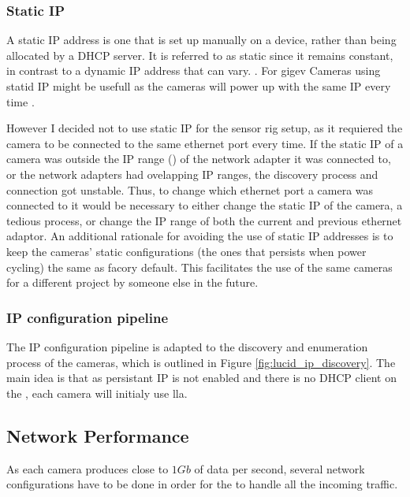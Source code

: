 \subsubsection{Static IP}
A static IP address is one that is set up manually on a device, rather than being allocated by a DHCP server.
It is referred to as static since it remains constant, in contrast to a dynamic IP address that can vary.
\cite{fisherStaticIPAddresses2021}.
For \gls{gigev} Cameras using statid IP might be usefull as the cameras will power up with the same IP every time \cite{teledyneSettingPersistentIP}.

However I decided not to use static IP for the sensor rig setup, as it requiered the camera to be connected to the same ethernet port every time.
If the static IP of a camera was outside the IP range (\todo) of the network adapter it was connected to, or the network adapters had ovelapping IP ranges, the discovery process and connection got unstable.
Thus, to change which ethernet port a camera was connected to it would be necessary to either change the static IP of the camera, a tedious process, or change the IP range of both the current and previous ethernet adaptor.
An additional rationale for avoiding the use of static IP addresses is to keep the cameras' static configurations (the ones that persists when power cycling) the same as facory default.
This facilitates the use of the same cameras for a different project by someone else in the future.

\subsubsection{IP configuration pipeline}
The IP configuration pipeline is adapted to the discovery and enumeration process of the \lucid cameras, which is outlined in Figure \ref{fig:lucid_ip_discovery}.
The main idea is that as persistant IP is not enabled and there is no DHCP client on the \jx, each camera will initialy use \gls{lla}.



\subsection{Network Performance}
As each camera produces close to $1Gb$ of data per second, several network configurations have to be done in order for the \jx to handle all the incoming traffic.

